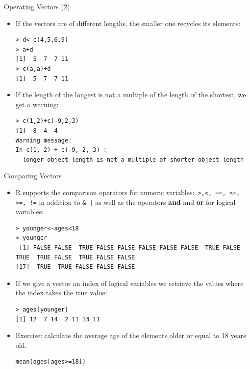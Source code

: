 \documentclass[handout]{beamer}
\begin{document}
\begin{frame}[fragile]{Operating Vectors (2)}
\scriptsize{
\begin{itemize}
\item If the vectors are of different lengths, the smaller one recycles its elements:
\begin{verbatim}
> d<-c(4,5,6,9)
> a+d
[1]  5  7  7 11
> c(a,a)+d
[1]  5  7  7 11
\end{verbatim}

\item If the length of the longest is not a multiple of the length of the shortest, we get a warning:
\begin{verbatim}
> c(1,2)+c(-9,2,3)
[1] -8  4  4
Warning message:
In c(1, 2) + c(-9, 2, 3) :
  longer object length is not a multiple of shorter object length 
\end{verbatim}
 
\end{itemize}
 }
\end{frame}



\begin{frame}[fragile]{Comparing Vectors}
\scriptsize{
\begin{itemize}
 \item R supports the comparison operators for numeric variables:\verb+ >,<, ==, <=, >=, !=+ in addition to \verb+& |+ as well as the operators \textbf{and} and \textbf{or} for logical variables:
\begin{verbatim}
> younger<-ages<18
> younger
 [1] FALSE FALSE  TRUE FALSE FALSE FALSE FALSE FALSE  TRUE FALSE  TRUE  TRUE FALSE  TRUE FALSE FALSE
[17]  TRUE  TRUE FALSE FALSE FALSE
\end{verbatim}
\item If we give a vector an index of logical variables we retrieve the values where the index takes the true value: 
\begin{verbatim}
> ages[younger] 
[1] 12  7 14  2 11 13 11
\end{verbatim}

\item Exercise: calculate the average age of the elements older or equal to 18 years old.
\begin{verbatim}
mean(ages[ages>=18]) 
\end{verbatim}

 
\end{itemize}



}
\end{frame}
\end{document}
